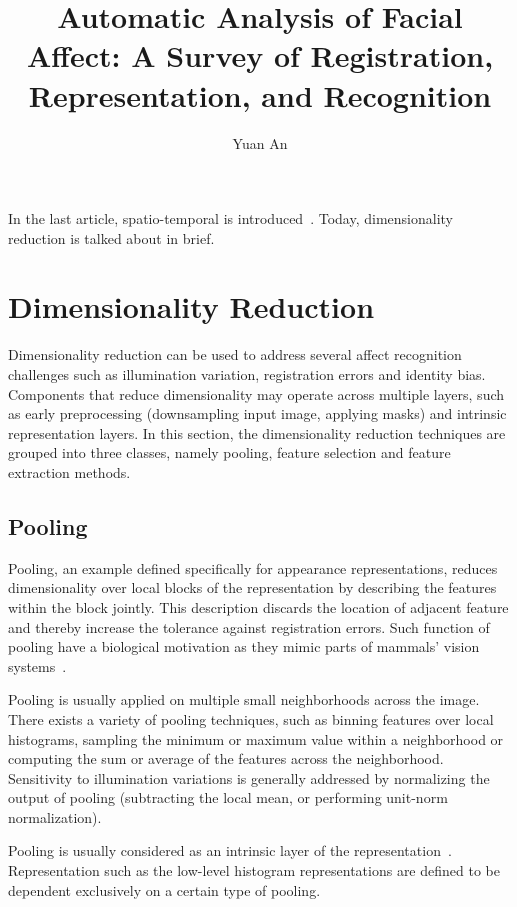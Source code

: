 \documentclass[10pt,twocolumn,letterpaper]{article}
\begin{document}
	\title{Automatic Analysis of Facial Affect: A Survey of Registration, Representation, and Recognition}	
	\author{Yuan An}
	\maketitle
	In the last article, spatio-temporal is introduced~\cite{Auto}. Today, dimensionality reduction is talked about in brief.
	\section*{Dimensionality Reduction}
	Dimensionality reduction can be used to address several affect recognition challenges such as illumination variation, registration errors and identity bias. Components that reduce dimensionality may operate across multiple layers, such as early preprocessing (\eg downsampling input image, applying masks) and intrinsic representation layers. In this section, the dimensionality reduction techniques are grouped into three classes, namely pooling, feature selection and feature extraction methods.
	\subsection*{Pooling}
	Pooling, an example defined specifically for appearance representations, reduces dimensionality over local blocks of the representation by describing the features within the block jointly. This description discards the location of adjacent feature and thereby increase the tolerance against registration errors. Such function of pooling have a biological motivation as they mimic parts of mammals' vision systems~\cite{Hubel}.
	\par
	Pooling is usually applied on multiple small neighborhoods across the image. There exists a variety of pooling techniques, such as binning features over local histograms, sampling the minimum or maximum value within a neighborhood or computing the sum or average of the features across the neighborhood. Sensitivity to illumination variations is generally addressed by normalizing the output of pooling (\eg subtracting the local mean, or performing unit-norm normalization).
	\par
	Pooling is usually considered as an intrinsic layer of the representation~\cite{LeCun}. Representation such as the low-level histogram representations are defined to be dependent exclusively on a certain type of pooling.
\end{document}
